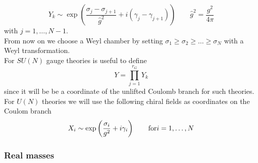 \begin{equation}
 Y_k \sim \exp \left( \frac{\sigma_j- \sigma_{j+1}}{\hat{g}^2} + i ( \gamma_j - \gamma_{j+1} )   \right) \qquad \hat{g}^2 =  \frac{g^2}{4 \pi}
\label{eqn:Y_def_sun_theories}
\end{equation}
with $j = 1, \dotsc , N -1$.\\
From now on we choose a Weyl chamber by setting $\sigma_1 \geq \sigma_2 \geq \dots \geq \sigma_N$ with a Weyl transformation.\\
For $SU(N)$ gauge theories is useful to define
\begin{equation}
 Y = \prod_{j=1}^{r_G} Y_k
 \label{eqn:definition_of_Y_sun}
\end{equation}
since it will be be a coordinate of the unlifted Coulomb branch for such theories.\\
For $U(N)$ theories we will use the following chiral fields as coordinates on the Coulom branch 
\begin{equation}
X_i  \sim \exp \left( \frac{\sigma_i}{g^2} + i \gamma_i \right) \qquad \hbox{for} i = 1, \dots , N
\label{eqn:defined_un_cb_coordinates}
\end{equation}














\subsubsection{Real masses}

